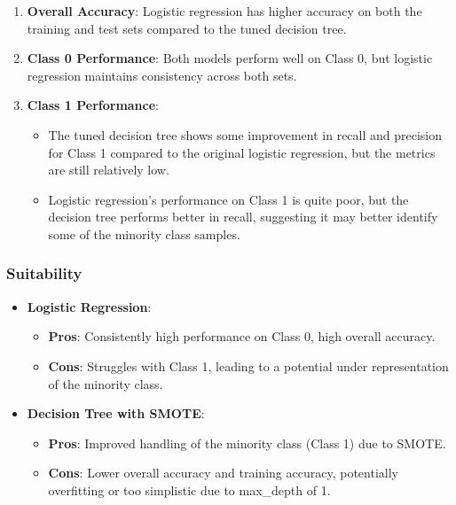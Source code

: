 \documentclass[11pt]{article}
\providecommand{\tightlist}{%
      \setlength{\itemsep}{0pt}\setlength{\parskip}{0pt}}
\begin{document}
\begin{enumerate}
\def\labelenumi{\arabic{enumi}.}
\tightlist
\item
  \textbf{Overall Accuracy}: Logistic regression has higher accuracy on
  both the training and test sets compared to the tuned decision tree.
\item
  \textbf{Class 0 Performance}: Both models perform well on Class 0, but
  logistic regression maintains consistency across both sets.
\item
  \textbf{Class 1 Performance}:

  \begin{itemize}
  \tightlist
  \item
    The tuned decision tree shows some improvement in recall and
    precision for Class 1 compared to the original logistic regression,
    but the metrics are still relatively low.
  \item
    Logistic regression's performance on Class 1 is quite poor, but the
    decision tree performs better in recall, suggesting it may better
    identify some of the minority class samples.
  \end{itemize}
\end{enumerate}

\subsubsection{Suitability}\label{suitability}

\begin{itemize}
\tightlist
\item
  \textbf{Logistic Regression}:

  \begin{itemize}
  \tightlist
  \item
    \textbf{Pros}: Consistently high performance on Class 0, high
    overall accuracy.
  \item
    \textbf{Cons}: Struggles with Class 1, leading to a potential under
    representation of the minority class.
  \end{itemize}
\item
  \textbf{Decision Tree with SMOTE}:

  \begin{itemize}
  \tightlist
  \item
    \textbf{Pros}: Improved handling of the minority class (Class 1) due
    to SMOTE.
  \item
    \textbf{Cons}: Lower overall accuracy and training accuracy,
    potentially overfitting or too simplistic due to max\_depth of 1.
  \end{itemize}
\end{itemize}
\end{document}
